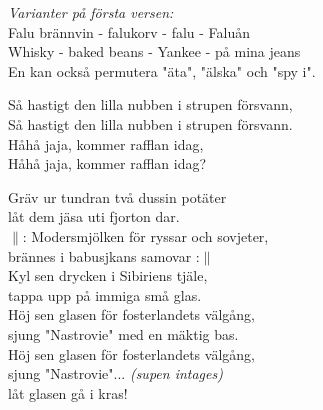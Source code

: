 \documentclass[a6paper, 10pt, twoside]{article}
\begin{document}
\newpage
\noindent
\textit{Varianter på första versen:}
\vspace{5pt}\\
Falu brännvin - falukorv - falu - Faluån
\vspace{5pt}\\
Whisky - baked beans - Yankee - på mina jeans
\vspace{5pt}\\
En kan också permutera "äta", "älska" och "spy i".
\vspace{10pt}
\begin{center}
\end{center}
\begin{lyrics}
Så hastigt den lilla nubben i strupen försvann, \\
Så hastigt den lilla nubben i strupen försvann. \\
Håhå jaja, kommer rafflan idag, \\
Håhå jaja, kommer rafflan idag? 
\end{lyrics}
\vspace{10pt}
\begin{center}
\end{center}
\begin{lyrics}
Gräv ur tundran två dussin potäter \\
låt dem jäsa uti fjorton dar. \\
$\|$: Modersmjölken för ryssar och sovjeter, \\
brännes i babusjkans samovar :$\|$
\vspace{5pt}\\
Kyl sen drycken i Sibiriens tjäle, \\
tappa upp på immiga små glas. \\
Höj sen glasen för fosterlandets välgång, \\
sjung "Nastrovie" med en mäktig bas. \\
Höj sen glasen för fosterlandets välgång, \\
sjung "Nastrovie"... \textit{(supen intages)} \\
låt glasen gå i kras! 
\end{lyrics}
\end{document}
